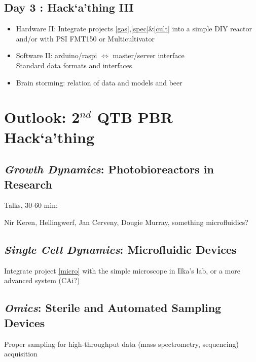 \documentclass[12pt,a4paper]{scrartcl}
\newcommand{\hack}[0]{Hack`a'thing}
\begin{document}
\subsection{Day 3 : \hack{} III}

\begin{itemize}
\item Hardware II: Integrate projects \ref{gas},\ref{spec}\&\ref{cult}
  into a simple DIY reactor and/or with PSI FMT150 or Multicultivator
\item Software II: arduino/raspi $\Leftrightarrow$  master/server interface\\
  Standard data formats and interfaces
\item Brain storming: relation of data and models and beer
\end{itemize}

\section{Outlook: 2$^{nd}$ QTB PBR \hack{}}

\subsection{\textit{Growth Dynamics}: Photobioreactors in Research}

Talks, 30-60 min:

Nir Keren, Hellingwerf, Jan Cerveny, Dougie Murray,
something microfluidics?

\subsection{\textit{Single Cell Dynamics}: Microfluidic Devices}
Integrate project \ref{micro} with the simple microscope in
Ilka's lab, or a more advanced system (CAi?)


\subsection{\textit{Omics}: Sterile and Automated Sampling Devices}

Proper sampling for high-throughput data (mass spectrometry, sequencing)
acquisition
\end{document}
